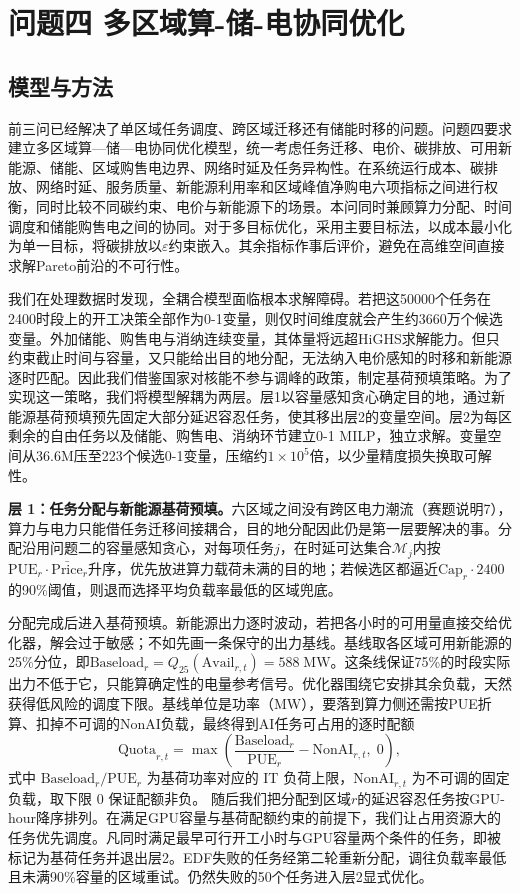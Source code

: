 \section{问题四 多区域算-储-电协同优化}

\subsection{模型与方法}

前三问已经解决了单区域任务调度、跨区域迁移还有储能时移的问题。问题四要求建立多区域算—储—电协同优化模型，统一考虑任务迁移、电价、碳排放、可用新能源、储能、区域购售电边界、网络时延及任务异构性。在系统运行成本、碳排放、网络时延、服务质量、新能源利用率和区域峰值净购电六项指标之间进行权衡，同时比较不同碳约束、电价与新能源下的场景。本问同时兼顾算力分配、时间调度和储能购售电之间的协同。对于多目标优化，采用主要目标法，以成本最小化为单一目标，将碳排放以$\varepsilon$约束嵌入。其余指标作事后评价，避免在高维空间直接求解Pareto前沿的不可行性。

我们在处理数据时发现，全耦合模型面临根本求解障碍。若把这50000个任务在2400时段上的开工决策全部作为0-1变量，则仅时间维度就会产生约3660万个候选变量。外加储能、购售电与消纳连续变量，其体量将远超HiGHS求解能力。但只约束截止时间与容量，又只能给出目的地分配，无法纳入电价感知的时移和新能源逐时匹配。因此我们借鉴国家对核能不参与调峰的政策，制定基荷预填策略。为了实现这一策略，我们将模型解耦为两层。层1以容量感知贪心确定目的地，通过新能源基荷预填预先固定大部分延迟容忍任务，使其移出层2的变量空间。层2为每区剩余的自由任务以及储能、购售电、消纳环节建立0-1 MILP，独立求解。变量空间从36.6M压至223个候选0-1变量，压缩约$1\times10^5$倍，以少量精度损失换取可解性。

\medskip\noindent\textbf{层 1：任务分配与新能源基荷预填。}六区域之间没有跨区电力潮流（赛题说明7），算力与电力只能借任务迁移间接耦合，目的地分配因此仍是第一层要解决的事。分配沿用问题二的容量感知贪心，对每项任务$j$，在时延可达集合$\mathcal{M}_j$内按$\text{PUE}_r\cdot\bar{\text{Price}}_r$升序，优先放进算力载荷未满的目的地；若候选区都逼近$\text{Cap}_r\cdot2400$的90\%阈值，则退而选择平均负载率最低的区域兜底。

分配完成后进入基荷预填。新能源出力逐时波动，若把各小时的可用量直接交给优化器，解会过于敏感；不如先画一条保守的出力基线。基线取各区域可用新能源的25\%分位，即$\text{Baseload}_r=Q_{25}(\text{Avail}_{r,t})=588\;\text{MW}$。这条线保证75\%的时段实际出力不低于它，只能算确定性的电量参考信号。优化器围绕它安排其余负载，天然获得低风险的调度下限。基线单位是功率（MW），要落到算力侧还需按PUE折算、扣掉不可调的NonAI负载，最终得到AI任务可占用的逐时配额
\begin{equation}
  \text{Quota}_{r,t} = \max\!\left(\frac{\text{Baseload}_r}{\text{PUE}_r} - \text{NonAI}_{r,t},\; 0\right),
\end{equation}
式中 $\text{Baseload}_r/\text{PUE}_r$ 为基荷功率对应的 IT 负荷上限，$\text{NonAI}_{r,t}$ 为不可调的固定负载，取下限 $0$ 保证配额非负。
随后我们把分配到区域$r$的延迟容忍任务按GPU-hour降序排列。在满足GPU容量与基荷配额约束的前提下，我们让占用资源大的任务优先调度。凡同时满足最早可行开工小时与GPU容量两个条件的任务，即被标记为基荷任务并退出层2。EDF失败的任务经第二轮重新分配，调往负载率最低且未满90\%容量的区域重试。仍然失败的50个任务进入层2显式优化。

